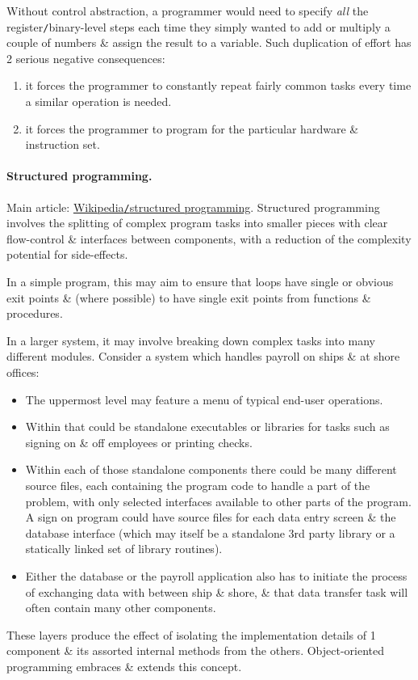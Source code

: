 \documentclass{article}
\begin{document}
Without control abstraction, a programmer would need to specify {\it all} the register{\tt/}binary-level steps each time they simply wanted to add or multiply a couple of numbers \& assign the result to a variable. Such duplication of effort has 2 serious negative consequences:
\begin{enumerate}
	\item it forces the programmer to constantly repeat fairly common tasks every time a similar operation is needed.
	\item it forces the programmer to program for the particular hardware \& instruction set.
\end{enumerate}

\paragraph{Structured programming.} Main article: \href{https://en.wikipedia.org/wiki/Structured_programming}{Wikipedia{\tt/}structured programming}. Structured programming involves the splitting of complex program tasks into smaller pieces with clear flow-control \& interfaces between components, with a reduction of the complexity potential for side-effects.

In a simple program, this may aim to ensure that loops have single or obvious exit points \& (where possible) to have single exit points from functions \& procedures.

In a larger system, it may involve breaking down complex tasks into many different modules. Consider a system which handles payroll on ships \& at shore offices:
\begin{itemize}
	\item The uppermost level may feature a menu of typical end-user operations.
	\item Within that could be standalone executables or libraries for tasks such as signing on \& off employees or printing checks.
	\item Within each of those standalone components there could be many different source files, each containing the program code to handle a part of the problem, with only selected interfaces available to other parts of the program. A sign on program could have source files for each data entry screen \& the database interface (which may itself be a standalone 3rd party library or a statically linked set of library routines).
	\item Either the database or the payroll application also has to initiate the process of exchanging data with between ship \& shore, \& that data transfer task will often contain many other components.
\end{itemize}
These layers produce the effect of isolating the implementation details of 1 component \& its assorted internal methods from the others. Object-oriented programming embraces \& extends this concept.
\end{document}

